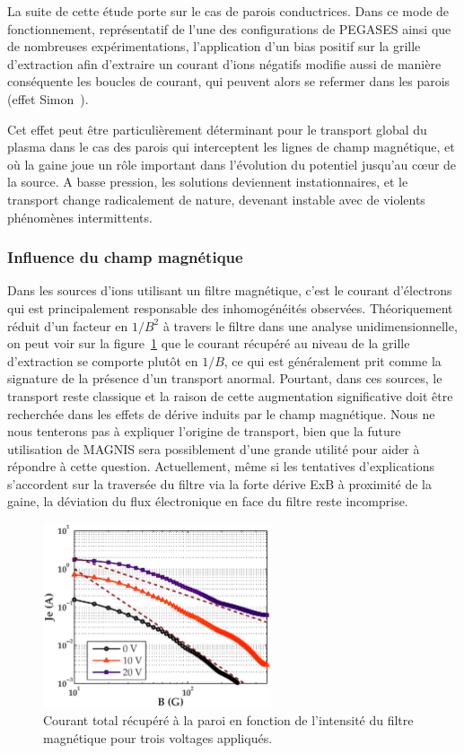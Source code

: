 \begin{refsection}
La suite de cette étude porte sur le cas de parois
conductrices. Dans ce mode de fonctionnement, représentatif de l'une des
configurations de PEGASES ainsi que de nombreuses expérimentations,
l'application d'un bias positif sur la grille d'extraction afin d'extraire un
courant d'ions négatifs modifie aussi de manière conséquente les boucles de
courant, qui peuvent alors se refermer dans les parois (effet
Simon~\parencite{Simon54}).

Cet effet peut être particulièrement déterminant pour le transport global du
plasma dans le cas des parois qui interceptent les lignes de champ magnétique,
et où la gaine joue un rôle important dans l'évolution du potentiel jusqu'au
c\oe{}ur de la source. A basse pression, les solutions deviennent instationnaires, et le transport
change radicalement de nature, devenant instable avec de violents phénomènes
intermittents.
	
\subsubsection{Influence du champ magnétique}
Dans les sources d'ions utilisant un filtre magnétique, c'est le courant
d'électrons qui est principalement responsable des inhomogénéités observées.
Théoriquement réduit d'un facteur en $1/B^2$ à travers le filtre dans une
analyse unidimensionnelle, on peut voir sur la
figure~\ref{pegasesVarMagCourantParoi} que le courant récupéré au niveau de la
grille d'extraction se comporte plutôt en $1/B$, ce qui est
généralement prit comme la signature de la présence d'un transport anormal.
Pourtant, dans ces sources, le transport reste classique et la raison de cette
augmentation significative doit être recherchée dans les effets de dérive
induits par le champ magnétique. Nous ne nous tenterons pas à
expliquer l'origine de transport, bien que la future utilisation de MAGNIS sera
possiblement d'une grande utilité pour aider à répondre à cette question.
Actuellement, même si les tentatives d'explications s'accordent sur la
traversée du filtre via la forte dérive ExB à proximité de la gaine, la
déviation du flux électronique en face du filtre reste incomprise.

\begin{figure}[!htbp]
	\centering
	\includegraphics[width=0.6\textwidth]{figures/4-pegasesVarMagCourantParoi.eps}
	{\caption{Courant total récupéré à la paroi en fonction de l'intensité du
	filtre magnétique pour trois voltages appliqués. }
	\label{pegasesVarMagCourantParoi}}
	\end{figure}


\end{refsection}
